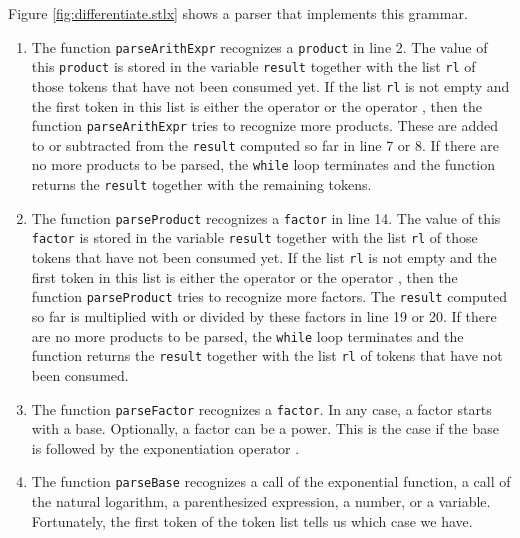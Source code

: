 \noindent
Figure \ref{fig:differentiate.stlx} shows a parser that implements this grammar.
\begin{enumerate}
\item The function \texttt{parseArithExpr} recognizes a \texttt{product} in line 2. 
      The value of this \texttt{product} is stored in the variable 
      \texttt{result} together with the list \texttt{rl} of those tokens that have not been consumed
      yet.  If the list \texttt{rl} is not empty and the first token in this
      list is either the operator \squoted{+} or the operator \squoted{-},
      then the function \texttt{parseArithExpr} tries to recognize more products.
      These are added to or subtracted from the \texttt{result} computed so far in
      line 7 or 8.  If there are no more products to be parsed, the \texttt{while} loop 
      terminates and the function returns the \texttt{result} together with the remaining
      tokens.
\item The function \texttt{parseProduct} recognizes a \texttt{factor} in line 14. 
      The value of this \texttt{factor} is stored in the variable 
      \texttt{result} together with the list \texttt{rl} of those tokens that have not been consumed
      yet.  If the list \texttt{rl} is not empty and the first token in this
      list is either the operator \squoted{*} or the operator \squoted{/},
      then the function \texttt{parseProduct} tries to recognize more factors.
      The \texttt{result} computed so far is multiplied with or divided by these factors in
      line 19 or 20.  If there are no more products to be parsed, the \texttt{while} loop 
      terminates and the function returns the \texttt{result} together with the list
      \texttt{rl} of tokens that have not been consumed.
\item The function \texttt{parseFactor} recognizes a \texttt{factor}.  
      In any case, a factor starts with a base.  Optionally, a factor can be a power.
      This is the case if the base is followed by the exponentiation operator \squoted{**}.
\item The function \texttt{parseBase} recognizes a call of the exponential function, a
      call of the natural logarithm, a parenthesized expression, a number, or a variable.
      Fortunately, the first token of the token list tells us which case we have.
\end{enumerate}

